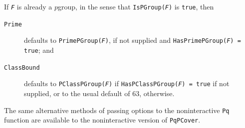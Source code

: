 \documentclass[a4paper,11pt]{report}
\begin{document}
{{{ If \mbox{\texttt{\mdseries\slshape F}} is already a $p$\texttt{}group, in the sense that \texttt{IsPGroup(\mbox{\texttt{\mdseries\slshape F}})} is \texttt{true}, then 
\begin{description}
\item[{\texttt{Prime}}]  defaults to \texttt{PrimePGroup(\mbox{\texttt{\mdseries\slshape F}})}, if not supplied and \texttt{HasPrimePGroup(\mbox{\texttt{\mdseries\slshape F}}) = true}; and 
\item[{\texttt{ClassBound}}]  defaults to \texttt{PClassPGroup(\mbox{\texttt{\mdseries\slshape F}})} if \texttt{HasPClassPGroup(\mbox{\texttt{\mdseries\slshape F}}) = true} if not supplied, or to the usual default of 63, otherwise. 
\end{description}
 The same alternative methods of passing options to the
non\texttt{}interactive \texttt{Pq} function are available to the non\texttt{}interactive version of \texttt{PqPCover}. 

}}}
\end{document}
